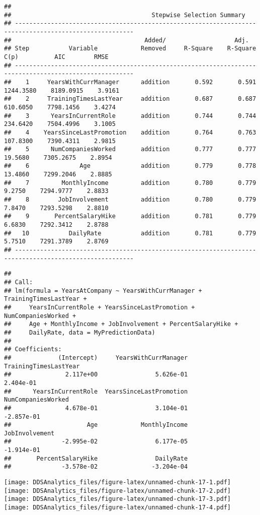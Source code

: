 \documentclass[]{article}
\begin{document}
\begin{verbatim}
## 
##                                       Stepwise Selection Summary                                        
## -------------------------------------------------------------------------------------------------------
##                                     Added/                   Adj.                                          
## Step           Variable            Removed     R-Square    R-Square      C(p)          AIC        RMSE     
## -------------------------------------------------------------------------------------------------------
##    1     YearsWithCurrManager      addition       0.592       0.591    1244.3580    8189.0915    3.9161    
##    2     TrainingTimesLastYear     addition       0.687       0.687     610.6050    7798.1456    3.4274    
##    3      YearsInCurrentRole       addition       0.744       0.744     234.6420    7504.4996    3.1005    
##    4    YearsSinceLastPromotion    addition       0.764       0.763     107.8300    7390.4311    2.9815    
##    5      NumCompaniesWorked       addition       0.777       0.777      19.5680    7305.2675    2.8954    
##    6              Age              addition       0.779       0.778      13.4860    7299.2046    2.8885    
##    7         MonthlyIncome         addition       0.780       0.779       9.2750    7294.9777    2.8833    
##    8        JobInvolvement         addition       0.780       0.779       7.8470    7293.5298    2.8810    
##    9       PercentSalaryHike       addition       0.781       0.779       6.6830    7292.3412    2.8788    
##   10           DailyRate           addition       0.781       0.779       5.7510    7291.3789    2.8769    
## -------------------------------------------------------------------------------------------------------
\end{verbatim}

\begin{verbatim}
## 
## Call:
## lm(formula = YearsAtCompany ~ YearsWithCurrManager + TrainingTimesLastYear + 
##     YearsInCurrentRole + YearsSinceLastPromotion + NumCompaniesWorked + 
##     Age + MonthlyIncome + JobInvolvement + PercentSalaryHike + 
##     DailyRate, data = MyPredictionData)
## 
## Coefficients:
##             (Intercept)     YearsWithCurrManager    TrainingTimesLastYear  
##               2.117e+00                5.626e-01                2.404e-01  
##      YearsInCurrentRole  YearsSinceLastPromotion       NumCompaniesWorked  
##               4.678e-01                3.104e-01               -2.857e-01  
##                     Age            MonthlyIncome           JobInvolvement  
##              -2.995e-02                6.177e-05               -1.914e-01  
##       PercentSalaryHike                DailyRate  
##              -3.578e-02               -3.204e-04
\end{verbatim}

\texttt{[image: DDSAnalytics\_files/figure-latex/unnamed-chunk-17-1.pdf]}
\texttt{[image: DDSAnalytics\_files/figure-latex/unnamed-chunk-17-2.pdf]}
\texttt{[image: DDSAnalytics\_files/figure-latex/unnamed-chunk-17-3.pdf]}
\texttt{[image: DDSAnalytics\_files/figure-latex/unnamed-chunk-17-4.pdf]}
\end{document}
